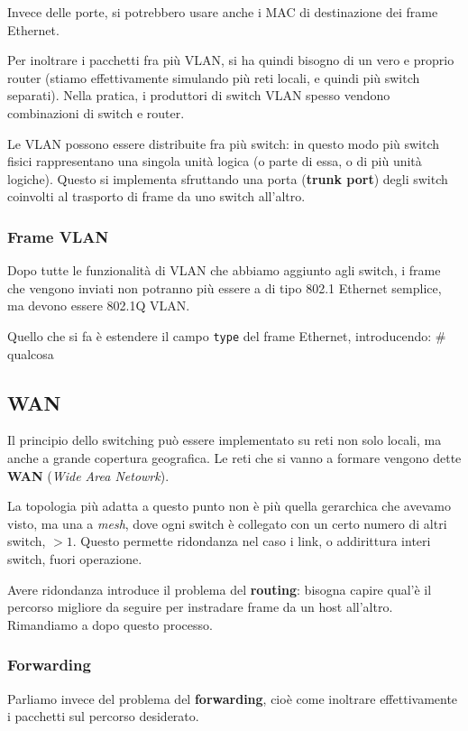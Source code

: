 \documentclass[a4paper,11pt]{article}
\begin{document}
Invece delle porte, si potrebbero usare anche i MAC di destinazione dei frame Ethernet.

Per inoltrare i pacchetti fra più VLAN, si ha quindi bisogno di un vero e proprio router (stiamo effettivamente simulando più reti locali, e quindi più switch separati). Nella pratica, i produttori di switch VLAN spesso vendono combinazioni di switch e router.

Le VLAN possono essere distribuite fra più switch: in questo modo più switch fisici rappresentano una singola unità logica (o parte di essa, o di più unità logiche).
Questo si implementa sfruttando una porta (\textbf{trunk port}) degli switch coinvolti al trasporto di frame da uno switch all'altro. 

\subsubsection{Frame VLAN}
Dopo tutte le funzionalità di VLAN che abbiamo aggiunto agli switch, i frame che vengono inviati non potranno più essere a di tipo 802.1 Ethernet semplice, ma devono essere 802.1Q VLAN.

Quello che si fa è estendere il campo \lstinline|type| del frame Ethernet, introducendo:
# qualcosa

\subsection{WAN}
Il principio dello switching può essere implementato su reti non solo locali, ma anche a grande copertura geografica.
Le reti che si vanno a formare vengono dette \textbf{WAN} (\textit{Wide Area Netowrk}).

La topologia più adatta a questo punto non è più quella gerarchica che avevamo visto, ma una a \textit{mesh}, dove ogni switch è collegato con un certo numero di altri switch, $> 1$. Questo permette ridondanza nel caso i link, o addirittura interi switch, fuori operazione.

Avere ridondanza introduce il problema del \textbf{routing}: bisogna capire qual'è il percorso migliore da seguire per instradare frame da un host all'altro. 
Rimandiamo a dopo questo processo.

\subsubsection{Forwarding}
Parliamo invece del problema del \textbf{forwarding}, cioè come inoltrare effettivamente i pacchetti sul percorso desiderato.
\end{document}

